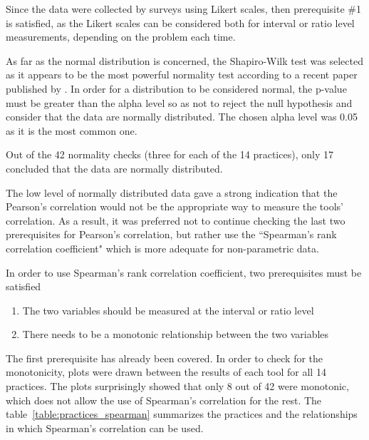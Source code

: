 Since the data were collected by surveys using Likert scales, then prerequisite \#1 is satisfied, as the Likert scales can be considered both for interval or ratio level measurements, depending on the problem each time.

As far as the normal distribution is concerned, the Shapiro-Wilk test was selected as it appears to be the most powerful normality test according to a recent paper published by \citet{Razali}. In order for a distribution to be considered normal, the p-value must be greater than the alpha level so as not to reject the null hypothesis and consider that the data are normally distributed. The chosen alpha level was 0.05 as it is the most common one.

Out of the 42 normality checks (three for each of the 14 practices), only 17 concluded that the data are normally distributed. 

The low level of normally distributed data gave a strong indication that the Pearson’s correlation would not be the appropriate way to measure the tools' correlation. As a result, it was preferred not to continue checking the last two prerequisites for Pearson’s correlation, but rather use the ``Spearman’s rank correlation coefficient" which is more adequate for non-parametric data.

In order to use Spearman’s rank correlation coefficient, two prerequisites must be satisfied
\begin{enumerate}
\item The two variables should be measured at the interval or ratio level
\item There needs to be a monotonic relationship between the two variables
\end{enumerate}

The first prerequisite has already been covered. In order to check for the monotonicity, plots were drawn between the results of each tool for all 14 practices. The plots surprisingly showed that only 8 out of 42 were monotonic, which does not allow the use of Spearman’s correlation for the rest. The table~\ref{table:practices_spearman} summarizes the practices and the relationships in which Spearman's correlation can be used.

